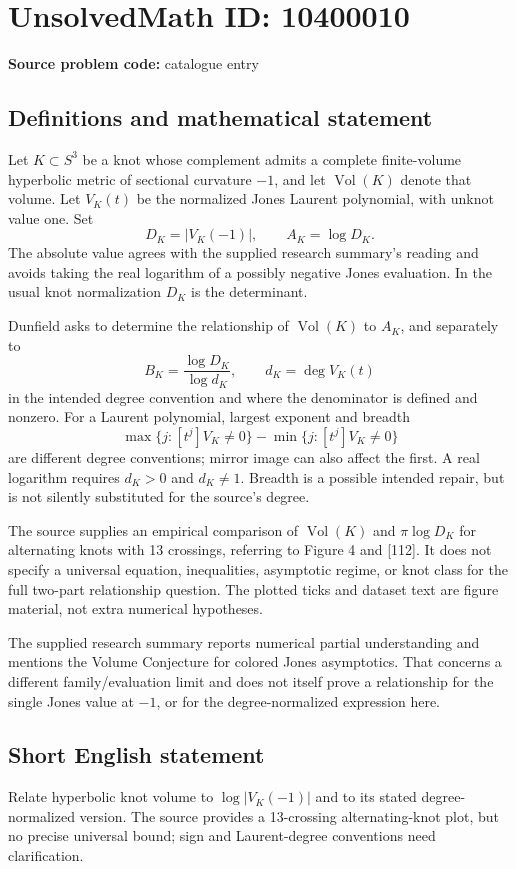 \documentclass[11pt]{article}
\begin{document}
\section*{UnsolvedMath ID: 10400010}
\textbf{Source problem code:} catalogue entry
\subsection{Definitions and mathematical statement}
Let \(K\subset S^3\) be a knot whose complement admits a complete finite-volume hyperbolic metric of sectional curvature \(-1\), and let \(\operatorname{Vol}(K)\) denote that volume. Let \(V_K(t)\) be the normalized Jones Laurent polynomial, with unknot value one. Set
\[
D_K=|V_K(-1)|,
\qquad A_K=\log D_K.
\]
The absolute value agrees with the supplied research summary's reading and avoids taking the real logarithm of a possibly negative Jones evaluation. In the usual knot normalization \(D_K\) is the determinant.

Dunfield asks to determine the relationship of \(\operatorname{Vol}(K)\) to \(A_K\), and separately to
\[
B_K=\frac{\log D_K}{\log d_K},\qquad d_K=\deg V_K(t)
\]
in the intended degree convention and where the denominator is defined and nonzero. For a Laurent polynomial, largest exponent and breadth
\[
\max\{j:[t^j]V_K\ne0\}-\min\{j:[t^j]V_K\ne0\}
\]
are different degree conventions; mirror image can also affect the first. A real logarithm requires \(d_K>0\) and \(d_K\ne1\). Breadth is a possible intended repair, but is not silently substituted for the source's degree.

The source supplies an empirical comparison of \(\operatorname{Vol}(K)\) and \(\pi\log D_K\) for alternating knots with 13 crossings, referring to Figure 4 and [112]. It does not specify a universal equation, inequalities, asymptotic regime, or knot class for the full two-part relationship question. The plotted ticks and dataset text are figure material, not extra numerical hypotheses.

The supplied research summary reports numerical partial understanding and mentions the Volume Conjecture for colored Jones asymptotics. That concerns a different family/evaluation limit and does not itself prove a relationship for the single Jones value at \(-1\), or for the degree-normalized expression here.
\subsection{Short English statement}
Relate hyperbolic knot volume to \(\log|V_K(-1)|\) and to its stated degree-normalized version. The source provides a 13-crossing alternating-knot plot, but no precise universal bound; sign and Laurent-degree conventions need clarification.
\end{document}
